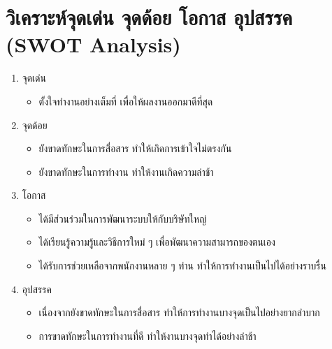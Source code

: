 \section{วิเคราะห์จุดเด่น จุดด้อย โอกาส อุปสรรค (SWOT Analysis)}
\begin{enumerate}
	\item จุดเด่น
	\begin{itemize}
		\item ตั้งใจทำงานอย่างเต็มที่ เพื่อให้ผลงานออกมาดีที่สุด
	\end{itemize}
	\item จุดด้อย
	\begin{itemize}
		\item ยังขาดทักษะในการสื่อสาร ทำให้เกิดการเข้าใจไม่ตรงกัน
		\item ยังขาดทักษะในการทำงาน ทำให้งานเกิดความล่าช้า
	\end{itemize}
	\item โอกาส
	\begin{itemize}
		\item ได้มีส่วนร่วมในการพัฒนาระบบให้กับบริษัทใหญ่
		\item ได้เรียนรู้ความรู้และวิธีการใหม่ ๆ เพื่อพัฒนาความสามารถของตนเอง
		\item ได้รับการช่วยเหลือจากพนักงานหลาย ๆ ท่าน ทำให้การทำงานเป็นไปได้อย่างราบรื่น
	\end{itemize}
	\item อุปสรรค
	\begin{itemize}
		\item เนื่องจากยังขาดทักษะในการสื่อสาร ทำให้การทำงานบางจุดเป็นไปอย่างยากลำบาก
		\item การขาดทักษะในการทำงานที่ดี ทำให้งานบางจุดทำได้อย่างล่าช้า
	\end{itemize}
\end{enumerate}

